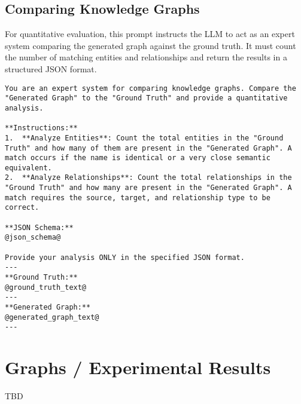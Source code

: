 \subsection{Comparing Knowledge Graphs}
For quantitative evaluation, this prompt instructs the LLM to act as an expert system comparing the generated graph against the ground truth. It must count the number of matching entities and relationships and return the results in a structured JSON format.

\begin{lstlisting}[style=promptstyle, caption={Prompt for quantitatively comparing two knowledge graphs.}, label={lst:prompt_compare_kgs}]
You are an expert system for comparing knowledge graphs. Compare the "Generated Graph" to the "Ground Truth" and provide a quantitative analysis.

**Instructions:**
1.  **Analyze Entities**: Count the total entities in the "Ground Truth" and how many of them are present in the "Generated Graph". A match occurs if the name is identical or a very close semantic equivalent.
2.  **Analyze Relationships**: Count the total relationships in the "Ground Truth" and how many are present in the "Generated Graph". A match requires the source, target, and relationship type to be correct.

**JSON Schema:**
@json_schema@

Provide your analysis ONLY in the specified JSON format.
---
**Ground Truth:**
@ground_truth_text@
---
**Generated Graph:**
@generated_graph_text@
---
\end{lstlisting}

\section{Graphs / Experimental Results}
TBD